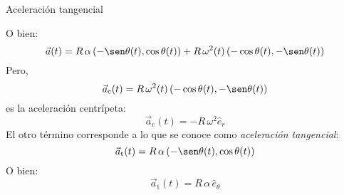 \documentclass[11pt,handout,aspectratio=1610]{beamer}
\begin{document}
\begin{frame}{Aceleración tangencial}

    O bien:
    \begin{equation*}
        \vec{a} (t) = R \, \alpha  \left(- \sen \theta (t),\cos \theta (t)\right) + R \, \omega^2 (t) \left(- \cos \theta(t), - \sen \theta(t)\right)
    \end{equation*} \pause Pero, $$\vec{a}_{\text{c}} (t) = R \, \omega^2 (t) \left(- \cos \theta(t), - \sen \theta(t)\right)$$ es la aceleración centrípeta: $$ \vec{a}_{\text{c}} (t) = - R \, \omega^2 \hat{e}_r$$ El otro término corresponde a lo que se conoce como \emph{aceleración tangencial}: $$\vec{a}_{\text{t}} (t) = R \, \alpha  \left(- \sen \theta (t),\cos \theta (t)\right)$$ O bien: $$ \vec{a}_{\text{t}} (t) = R \, \alpha \, \hat{e}_\theta $$

\end{frame}
\end{document}
